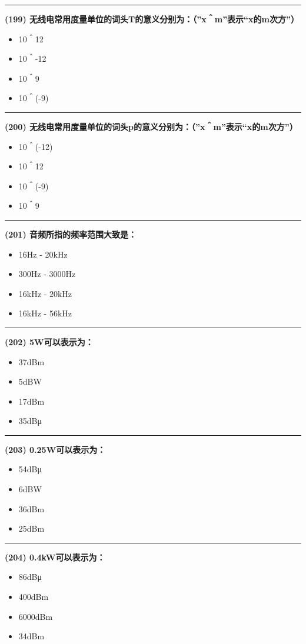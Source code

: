 \documentclass[twocolumn]{ctexart}  %
\begin{document}
\noindent\rule{0.5\textwidth}{1pt}
\heiti \textbf{(199) 无线电常用度量单位的词头T的意义分别为：（”x＾m”表示“x的m次方”）} \songti {\color{gray} [LK0472] }
\begin{itemize}
	\item  10＾12
	\item  10＾-12
	\item  10＾9
	\item  10＾(-9)
\end{itemize}


\noindent\rule{0.5\textwidth}{1pt}
\heiti \textbf{(200) 无线电常用度量单位的词头p的意义分别为：（”x＾m”表示“x的m次方”）} \songti {\color{gray} [LK0473] }
\begin{itemize}
	\item  10＾(-12)
	\item  10＾12
	\item  10＾(-9)
	\item  10＾9
\end{itemize}


\noindent\rule{0.5\textwidth}{1pt}
\heiti \textbf{(201) 音频所指的频率范围大致是：} \songti {\color{gray} [LK0495] }
\begin{itemize}
	\item  16Hz - 20kHz
	\item  300Hz - 3000Hz
	\item  16kHz - 20kHz
	\item  16kHz - 56kHz
\end{itemize}


\noindent\rule{0.5\textwidth}{1pt}
\heiti \textbf{(202) 5W可以表示为：} \songti {\color{gray} [LK0566] }
\begin{itemize}
	\item  37dBm
	\item  5dBW
	\item  17dBm
	\item  35dBμ
\end{itemize}


\noindent\rule{0.5\textwidth}{1pt}
\heiti \textbf{(203) 0.25W可以表示为：} \songti {\color{gray} [LK0567] }
\begin{itemize}
	\item  54dBμ
	\item  6dBW
	\item  36dBm
	\item  25dBm
\end{itemize}


\noindent\rule{0.5\textwidth}{1pt}
\heiti \textbf{(204) 0.4kW可以表示为：} \songti {\color{gray} [LK0568] }
\begin{itemize}
	\item  86dBμ
	\item  400dBm
	\item  6000dBm
	\item  34dBm
\end{itemize}
\end{document}

